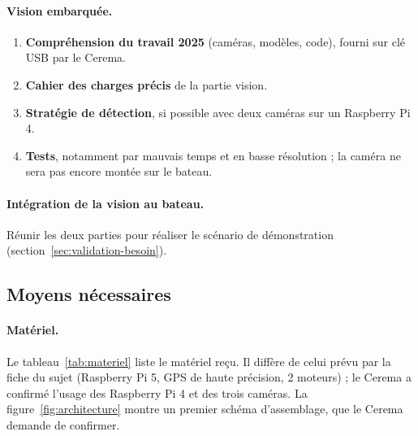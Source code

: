 \paragraph{Vision embarquée.}
\begin{enumerate}
  \item \textbf{Compréhension du travail 2025} (caméras, modèles, code), fourni sur clé USB par le Cerema.
  \item \textbf{Cahier des charges précis} de la partie vision.
  \item \textbf{Stratégie de détection}, si possible avec deux caméras sur un Raspberry Pi 4.
  \item \textbf{Tests}, notamment par mauvais temps et en basse résolution ; la caméra ne sera pas encore montée sur le bateau.
\end{enumerate}

\paragraph{Intégration de la vision au bateau.} Réunir les deux parties pour réaliser le scénario de démonstration (section~\ref{sec:validation-besoin}).

\subsection{Moyens nécessaires}

\paragraph{Matériel.} Le tableau~\ref{tab:materiel} liste le matériel reçu. Il diffère de celui prévu par la fiche du sujet (Raspberry Pi 5, GPS de haute précision, 2 moteurs) ; le Cerema a confirmé l'usage des Raspberry Pi 4 et des trois caméras. La figure~\ref{fig:architecture} montre un premier schéma d'assemblage, que le Cerema demande de confirmer.

